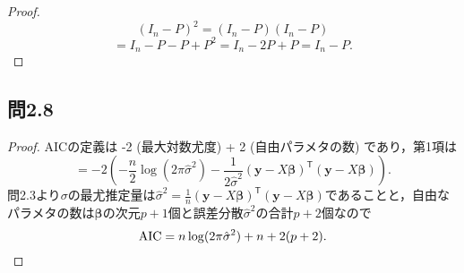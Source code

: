 \documentclass[pdflatex,ja=standard]{bxjsarticle}
\begin{document}
\begin{proof}
\begin{equation}
(I_n - P)^2 = (I_n - P) (I_n - P)
\end{equation}
\begin{equation}
= I_n - P - P + P^2 = I_n - 2P + P = I_n - P.
\end{equation}
\end{proof}

\subsection*{問2.8}
\begin{proof}
AICの定義は -2 (最大対数尤度) + 2 (自由パラメタの数) であり，第1項は
\begin{equation}
= -2 \left( - \frac{n}{2} \log (2 \pi \hat{\sigma}^2) - \frac{1}{2 \hat{\sigma}^2} (\bm{y} - X \bm{\beta})^{\mathsf{T}} (\bm{y} - X \bm{\beta}) \right).
\end{equation}
問2.3より$\sigma$の最尤推定量は$\hat{\sigma}^2 = \frac{1}{n} (\bm{y} - X \bm{\beta})^{\mathsf{T}} (\bm{y} - X \bm{\beta})$であることと，自由なパラメタの数は$\bm{\beta}$の次元$p+1$個と誤差分散$\hat{\sigma}^2$の合計$p+2$個なので
\begin{equation}
{\rm AIC} = n \log (2 \pi \hat{\sigma}^2) + n + 2(p + 2).
\end{equation}
\end{proof}
\end{document}

